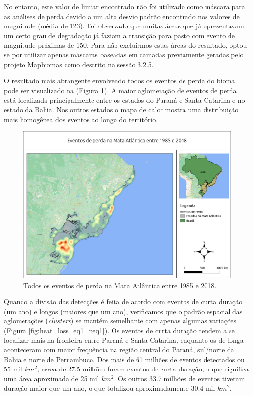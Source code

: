 No entanto, este valor de limiar encontrado não foi utilizado como máscara para as análises de perda devido a um alto desvio padrão encontrado nos valores de magnitude (média de 123). Foi observado que muitas áreas que já apresentavam um certo grau de degradação já faziam a transição para pasto com evento de magnitude próximas de 150. Para não excluirmos estas áreas do resultado, optou-se por utilizar apenas máscaras baseadas em camadas previamente geradas pelo projeto Mapbiomas como descrito na sessão 3.2.5.

O resultado mais abrangente envolvendo todos os eventos de perda do bioma pode ser visualizado na (Figura \ref{fig:heat_loss_masked85_maskedgain}). A maior aglomeração de eventos de perda está localizada principalmente entre os estados do Paraná e Santa Catarina e no estado da Bahia. Nos outros estados o mapa de calor mostra uma distribuição mais homogênea dos eventos ao longo do território. 

\begin{figure}[H]
    \centering
    \includegraphics[scale=.5]{images/heatmap_loss_masked85_maskedgain.png}
    \caption{Todos os eventos de perda na Mata Atlântica entre 1985 e 2018.}
    \label{fig:heat_loss_masked85_maskedgain}
\end{figure}

Quando a divisão das detecções é feita de acordo com eventos de curta duração (um ano) e longos (maiores que um ano), verificamos que o padrão espacial das aglomerações (\textit{clusters}) se mantém semelhante com apenas algumas variações (Figura \ref{fig:heat_loss_eq1_neq1}). Os eventos de curta duração tendem a se localizar mais na fronteira entre Paraná e Santa Catarina, enquanto os de longa aconteceram com maior frequência na região central do Paraná, sul/norte da Bahia e norte de Pernambuco. Dos mais de 61 milhões de eventos detectados ou 55 mil $ km^2 $, cerca de 27.5 milhões foram eventos de curta duração, o que significa uma área aproximada de 25 mil $ km^2 $. Os outros 33.7 milhões de eventos tiveram duração maior que um ano, o que totalizou aproximadamente 30.4 mil $ km^2 $.

